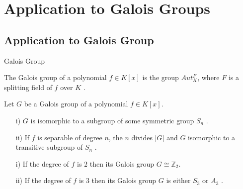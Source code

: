 \documentclass{beamer}
\begin{document}
\section{Application to Galois Groups}

\subsection{Application to Galois Group}
\begin{frame}{Galois Group}
  \begin{definition}
    The Galois group of a polynomial \(f \in K[x]\) is the group \(Aut_K^F\), where \(F\) is a splitting field of \(f\) over \(K\) \cite{hunger}.
  \end{definition}


  \begin{tcolorbox}[colback=white, colframe=blue!40, boxsep=1mm]
    \begin{theorem}
      Let \(G\) be a Galois group of a polynomial \(f \in K[x]\).
      \begin{enumerate}
      \item[i)] \(G\) is isomorphic to a subgroup of some symmetric group \(S_n\) \cite{hunger}.
      \item[ii)] If \(f\) is separable of degree \(n\), the \(n\) divides \(|G|\) and \(G\) isomorphic to a transitive subgroup of \(S_n\) \cite{hunger}.
      \end{enumerate}
    \end{theorem}
  \end{tcolorbox}


  \begin{theorem}[Corollary]
    \begin{enumerate}
    \item[i)] If the degree of \(f\) is \(2\) then its Galois group \(G \cong {\mathbb{Z}}_2\).
    \item[ii)] If the degree of \(f\) is \(3\) then its Galois group \(G\) is either \(S_3\) or \(A_3\) \cite{hunger}.
    \end{enumerate}
  \end{theorem}

\end{frame}
\end{document}
